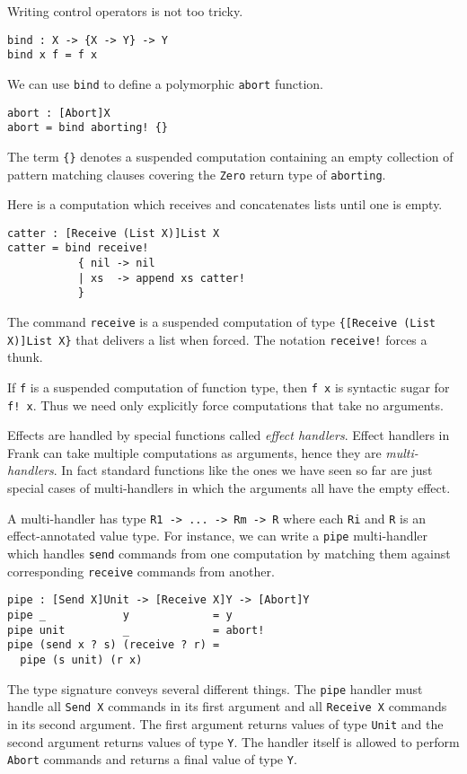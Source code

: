 \documentclass[preprint]{sigplanconf}
\begin{document}
Writing control operators is not too tricky.
\begin{verbatim}
bind : X -> {X -> Y} -> Y
bind x f = f x
\end{verbatim}

We can use \verb!bind! to define a polymorphic \verb!abort! function.
\begin{verbatim}
abort : [Abort]X
abort = bind aborting! {}
\end{verbatim}
The term \verb!{}! denotes a suspended computation containing an empty
collection of pattern matching clauses covering the \verb!Zero! return
type of \verb!aborting!.

Here is a computation which receives and concatenates lists until one
is empty.
%
\begin{verbatim}
catter : [Receive (List X)]List X
catter = bind receive!
           { nil -> nil
           | xs  -> append xs catter!
           }
\end{verbatim}
%
The command \verb!receive! is a suspended computation of type
\verb!{[Receive (List X)]List X}! that delivers a list when
forced. The notation \verb|receive!| forces a thunk.

If \verb!f! is a suspended computation of function type, then
\verb!f x! is syntactic sugar for \verb|f! x|. Thus we need only
explicitly force computations that take no arguments.

Effects are handled by special functions called \emph{effect
  handlers}. Effect handlers in Frank can take multiple computations
as arguments, hence they are \emph{multi-handlers}. In fact standard
functions like the ones we have seen so far are just special cases of
multi-handlers in which the arguments all have the empty effect.

A multi-handler has type \verb!R1 -> ... -> Rm -> R! where each
\verb!Ri! and \verb!R! is an effect-annotated value type. For
instance, we can write a \verb!pipe! multi-handler which handles
\verb!send! commands from one computation by matching them against
corresponding \verb!receive! commands from another.
%
\begin{verbatim}
pipe : [Send X]Unit -> [Receive X]Y -> [Abort]Y
pipe _            y             = y
pipe unit         _             = abort!
pipe (send x ? s) (receive ? r) =
  pipe (s unit) (r x)
\end{verbatim}
%
The type signature conveys several different things. The \verb!pipe!
  handler must handle all \verb!Send X! commands in its first argument
  and all \verb!Receive X! commands in its second argument. The first
  argument returns values of type \verb!Unit! and the second argument
  returns values of type \verb!Y!. The handler itself is allowed to
  perform \verb!Abort!  commands and returns a final value of type
  \verb!Y!.
\end{document}
